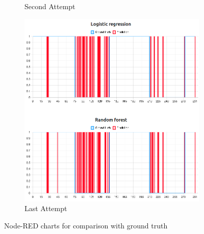 \documentclass[10pt, conference]{IEEEtran}
\begin{document}
\begin{figure}[t]
\begin{subfigure}[b]{.33\linewidth}
        \caption{Second Attempt}
        \label{fig:chart-second-attempt}
    \end{subfigure}
    \begin{subfigure}[b]{.33\linewidth}
        \centering
        \includegraphics[width=\linewidth]{resources/prediction_with_inbound_and_outbound_features_bitrate_cropped.png}
        \caption{Last Attempt}
        \label{fig:chart-third-attempt}
    \end{subfigure}
    \caption{Node-RED charts for comparison with ground truth}
    \label{fig:charts-node-red}
\end{figure}
\end{document}
